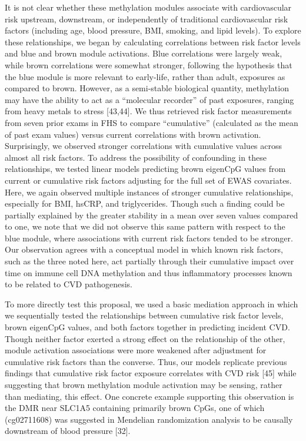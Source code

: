 \documentclass[]{article}
\theoremstyle{definition}
\theoremstyle{definition}
\theoremstyle{definition}
\theoremstyle{remark}
\begin{document}
It is not clear whether these methylation modules associate with
cardiovascular risk upstream, downstream, or independently of
traditional cardiovascular risk factors (including age, blood pressure,
BMI, smoking, and lipid levels). To explore these relationships, we
began by calculating correlations between risk factor levels and blue
and brown module activations. Blue correlations were largely weak,
while brown correlations were somewhat stronger, following the
hypothesis that the blue module is more relevant to early-life, rather
than adult, exposures as compared to brown. However, as a semi-stable
biological quantity, methylation may have the ability to act as a
``molecular recorder'' of past exposures, ranging from heavy metals to
stress {[}43,44{]}. We thus retrieved risk factor measurements from
seven prior exams in FHS to compare ``cumulative'' (calculated as the
mean of past exam values) versus current correlations with brown
activation. Surprisingly, we observed stronger correlations with
cumulative values across almost all risk factors. To address the
possibility of confounding in these relationships, we tested linear
models predicting brown eigenCpG values from current or cumulative risk
factors adjusting for the full set of EWAS covariates. Here, we again
observed multiple instances of stronger cumulative relationships,
especially for BMI, hsCRP, and triglycerides. Though such a finding
could be partially explained by the greater stability in a mean over
seven values compared to one, we note that we did not observe this same
pattern with respect to the blue module, where associations with current
risk factors tended to be stronger. Our observation agrees with a
conceptual model in which known risk factors, such as the three noted
here, act partially through their cumulative impact over time on immune
cell DNA methylation and thus inflammatory processes known to be related
to CVD pathogenesis.

To more directly test this proposal, we used a basic mediation approach
in which we sequentially tested the relationships between cumulative
risk factor levels, brown eigenCpG values, and both factors together in
predicting incident CVD. Though neither factor exerted a strong effect
on the relationship of the other, module activation associations were
more weakened after adjustment for cumulative risk factors than the
converse. Thus, our models replicate previous findings that cumulative
risk factor exposure correlates with CVD risk {[}45{]} while suggesting
that brown methylation module activation may be sensing, rather than
mediating, this effect. One concrete example supporting this observation
is the DMR near SLC1A5 containing primarily brown CpGs, one of which
(cg02711608) was suggested in Mendelian randomization analysis to be
causally downstream of blood pressure {[}32{]}.
\end{document}
